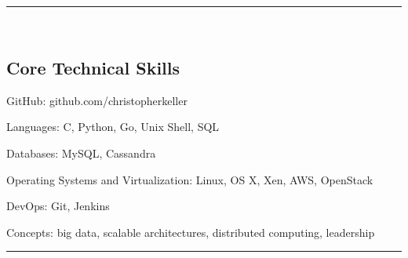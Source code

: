 

\hrule\
\vspace{-0.4em}
\subsection*{Core Technical Skills}
\begin{indentsection}{\parindent}
    \begin{description*}
        \item[GitHub:] github.com/christopherkeller
        \item[Languages:] C, Python, Go, Unix Shell, \textsc{SQL}
        \item[Databases:] My\textsc{SQL}, Cassandra
        \item[Operating Systems and Virtualization:] Linux, \textsc{OS X}, Xen, AWS, OpenStack
        \item[DevOps:] Git, Jenkins
        \item[Concepts:] big data, scalable architectures, distributed computing, leadership
	\end{description*}
\end{indentsection}
\hrule\
\vspace{-0.4em}
